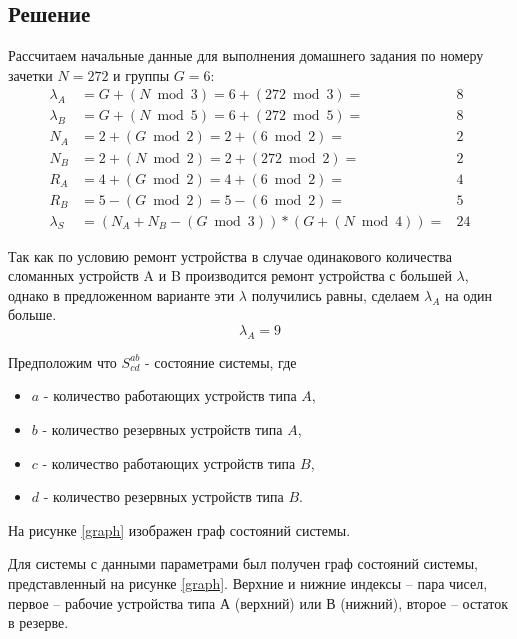\subsection{Решение}

Рассчитаем начальные данные для выполнения домашнего задания по номеру зачетки $N = 272$ и группы $G = 6$:
\[
\begin{matrix}
    \lambda_A & = G + (N \bmod 3) = 6 + (272 \bmod 3) = & 8 \\
    \lambda_B & = G + (N \bmod 5) = 6 + (272 \bmod 5) = & 8 \\
    N_A & = 2 + (G \bmod 2) = 2 + (6 \bmod 2) = & 2 \\
    N_B & = 2 + (N \bmod 2) = 2 + (272 \bmod 2) = & 2 \\
    R_A & = 4 + (G \bmod 2) = 4 + (6 \bmod 2) = & 4 \\
    R_B & = 5 - (G \bmod 2) = 5 - (6 \bmod 2) = & 5 \\
    \lambda_S & = (N_A + N_B - (G \bmod 3)) * (G + (N \bmod 4)) = & 24
\end{matrix}
\]


    Так как по условию ремонт устройства в случае одинакового количества сломанных устройств A и B производится ремонт устройства
    с большей $\lambda$, однако в предложенном варианте эти $\lambda$ получились равны, сделаем $\lambda_A$ на один больше.
    \[\lambda_A = 9\]


Предположим что $S^{ab}_{cd}$ - состояние системы, где
\begin{itemize}
    \item $a$ - количество работающих устройств типа $A$,
    \item $b$ - количество резервных устройств типа $A$,
    \item $c$ - количество работающих устройств типа $B$,
    \item $d$ - количество резервных устройств типа $B$.
\end{itemize}
На рисунке \ref{graph} изображен граф состояний системы.

Для системы с данными параметрами был получен граф состояний системы, представленный на рисунке \ref{graph}. Верхние и нижние индексы -- пара чисел, первое -- рабочие устройства типа $А$ (верхний) или $В$ (нижний), второе -- остаток в резерве.

